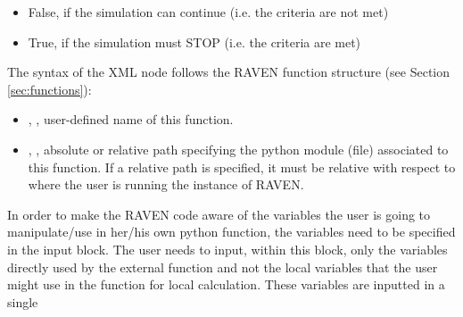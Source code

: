 \begin{itemize}
\begin{itemize}
                                                              \item False, if the simulation can continue (i.e. the criteria are not met)
                                                              \item True, if the simulation must STOP (i.e. the criteria are met)
                                                            \end{itemize}
                                                            The syntax of the XML node follows the RAVEN function structure (see Section \ref{sec:functions}):
                                                            \begin{itemize}
                                                              \itemsep0em
                                                              \item {}, , user-defined name of this function.
                                                              \item {}, , absolute or
                                                              relative path specifying the python module (file) associated to this function.
                                                              \nb If a relative path is specified, it must be relative with respect
                                                              to where the user is running the instance of RAVEN.
                                                            \end{itemize}
                                                            In order to make the RAVEN code aware of the variables the user is going to
                                                            manipulate/use in her/his own python function, the variables need to be
                                                            specified in the  input block.
                                                            The user needs to input, within this block, only the variables directly used by
                                                            the external function and not the local variables that the user might use in the function for local calculation.
                                                            These variables are inputted in a single

\end{itemize}
